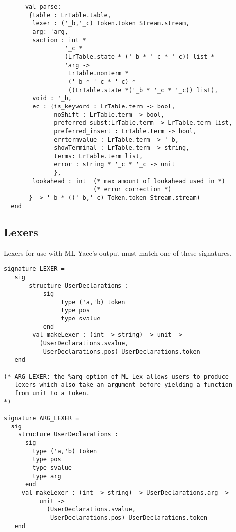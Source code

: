 \begin{tt}
\begin{verbatim}
      val parse:
       {table : LrTable.table,
        lexer : ('_b,'_c) Token.token Stream.stream,
        arg: 'arg,
        saction : int *
                 '_c *
                 (LrTable.state * ('_b * '_c * '_c)) list * 
                 'arg ->
                  LrTable.nonterm *
                  ('_b * '_c * '_c) *
                  ((LrTable.state *('_b * '_c * '_c)) list),
        void : '_b,
        ec : {is_keyword : LrTable.term -> bool,
              noShift : LrTable.term -> bool,
              preferred_subst:LrTable.term -> LrTable.term list,
              preferred_insert : LrTable.term -> bool,
              errtermvalue : LrTable.term -> '_b,
              showTerminal : LrTable.term -> string,
              terms: LrTable.term list,
              error : string * '_c * '_c -> unit
              },
        lookahead : int  (* max amount of lookahead used in *)
                         (* error correction *)
       } -> '_b * (('_b,'_c) Token.token Stream.stream)
  end
\end{verbatim}
\end{tt}

\subsection{Lexers}

Lexers for use with ML-Yacc's output must match one of these signatures.

\begin{tt}
\begin{verbatim}
signature LEXER =
   sig
       structure UserDeclarations :
           sig
                type ('a,'b) token
                type pos
                type svalue
           end
        val makeLexer : (int -> string) -> unit -> 
          (UserDeclarations.svalue,
           UserDeclarations.pos) UserDeclarations.token
   end

(* ARG_LEXER: the %arg option of ML-Lex allows users to produce
   lexers which also take an argument before yielding a function
   from unit to a token.
*)

signature ARG_LEXER =
  sig
    structure UserDeclarations :
      sig
        type ('a,'b) token
        type pos
        type svalue
        type arg
      end
     val makeLexer : (int -> string) -> UserDeclarations.arg ->
          unit -> 
            (UserDeclarations.svalue,
             UserDeclarations.pos) UserDeclarations.token
   end
\end{verbatim}
\end{tt}

